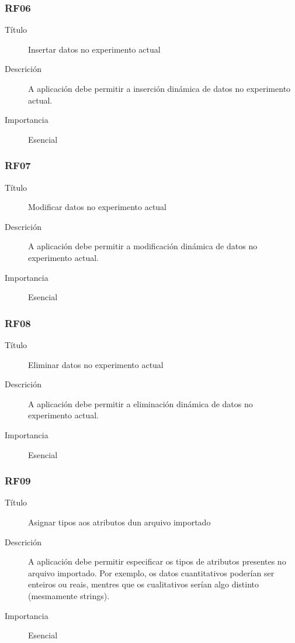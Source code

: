 \subsubsection*{RF06}
\begin{description}
\item[Título] \hfill
Insertar datos no experimento actual
\item[Descrición] \hfill
A aplicación debe permitir a inserción dinámica de datos no experimento actual.
\item[Importancia] \hfill
Esencial
\end{description}

\subsubsection*{RF07}
\begin{description}
\item[Título] \hfill
Modificar datos no experimento actual
\item[Descrición] \hfill
A aplicación debe permitir a modificación dinámica de datos no experimento actual.
\item[Importancia] \hfill
Esencial
\end{description}

\subsubsection*{RF08}
\begin{description}
\item[Título] \hfill
Eliminar datos no experimento actual
\item[Descrición] \hfill
A aplicación debe permitir a eliminación dinámica de datos no experimento actual.
\item[Importancia] \hfill
Esencial
\end{description}

\subsubsection*{RF09}
\begin{description}
\item[Título] \hfill
Asignar tipos aos atributos dun arquivo importado
\item[Descrición] \hfill
A aplicación debe permitir especificar os tipos de atributos presentes no arquivo importado. Por exemplo, os datos cuantitativos poderían ser enteiros ou reais, mentres que os cualitativos serían algo distinto (mesmamente strings).
\item[Importancia] \hfill
Esencial
\end{description}

